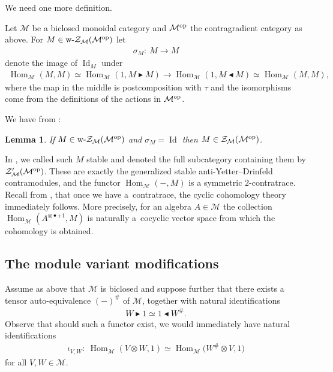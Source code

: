 \documentclass[10pt,a4paper]{amsart}
\newcommand{\Zc}{\mathcal{Z}}
\newcommand{\id}{1}
\newcommand{\lab}{\blacktriangleright}
\newcommand{\rab}{\blacktriangleleft}
\def\ot{\otimes}
\numberwithin{equation}{section}
\newtheorem{Lemma}[Theorem]{Lemma}
 { \theoremstyle{definition}
\newtheorem{Definition}[Theorem]{Definition}
\newtheorem{Remark}[Theorem]{Remark} }
\begin{document}
 We need one more definition.

\begin{Definition}Let $\mathcal{M} $ be a biclosed monoidal category and $\mathcal{M}^{\rm op}$ the contragradient category as above. For $M\in \text{\rm w-}\Zc_{\mathcal{M}}(\mathcal{M}^{\rm op})$ let
\begin{gather*}
\sigma_M\colon \ M\to M
\end{gather*} denote the image of $\operatorname{Id}_M$ under \begin{gather*}\operatorname{Hom}_\mathcal{M}(M,M)\simeq\operatorname{Hom}_\mathcal{M}(\id,M\lab M)\to\operatorname{Hom}_\mathcal{M}(\id,M\rab M)\simeq \operatorname{Hom}_\mathcal{M}(M,M),\end{gather*}
where the map in the middle is postcomposition with $\tau$ and the isomorphisms come from the definitions of the actions in $\mathcal{M}^{\rm op}$.
\end{Definition}

We have from \cite{sk}:
\begin{Lemma}\label{weakstrong} If $M\in \text{\rm w-}\Zc_{\mathcal{M}}(\mathcal{M}^{\rm op})$ and $\sigma_M=\operatorname{Id}$ then $M\in \Zc_{\mathcal{M}}(\mathcal{M}^{\rm op})$.
 \end{Lemma}

 In \cite{sk}, we called such $M$ stable and denoted the full subcategory containing them by $\Zc_{\mathcal{M}}'(\mathcal{M}^{\rm op})$. These are exactly the generalized stable anti-Yetter--Drinfeld contramodules, and the functor $\operatorname{Hom}_{\mathcal{M}}(-,M)$ is a symmetric $2$-contratrace. Recall from \cite{hks}, that once we have a~contratrace, the cyclic cohomology theory immediately follows. More precisely, for an algebra $A\in\mathcal{M}$ the collection $\operatorname{Hom}_{\mathcal{M}}(A^{\ot\bullet+1},M)$ is naturally a~cocyclic vector space from which the cohomology is obtained.

 \subsection{The module variant modifications}
 Assume as above that $\mathcal{M}$ is biclosed and suppose further that there exists a tensor auto-equivalence $(-)^{\#}$ of $\mathcal{M}$, together with natural identifications
 \begin{gather*}
 W\lab 1\simeq 1\rab W^{\#}.
 \end{gather*}
 Observe that should such a functor exist, we would immediately have natural identifications
 \begin{gather*}
 \iota_{V,W}\colon \ \operatorname{Hom}_\mathcal{M}(V\ot W, 1)\simeq \operatorname{Hom}_\mathcal{M}\big(W^{\#}\ot V, 1\big)
 \end{gather*}
 for all $V,W\in\mathcal{M}$.
\end{document}
